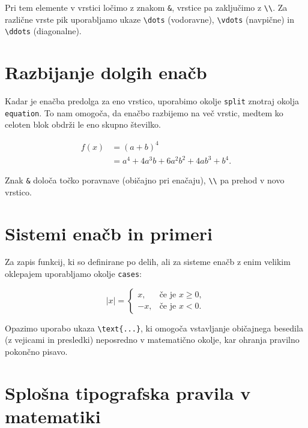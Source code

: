 \documentclass[a4paper,12pt,openright]{book}
\begin{document}
Pri tem elemente v vrstici ločimo z znakom \texttt{\&}, vrstice pa zaključimo z \texttt{\textbackslash\textbackslash}. Za različne vrste pik uporabljamo ukaze \verb|\dots| (vodoravne), \verb|\vdots| (navpične) in \verb|\ddots| (diagonalne).

\section{Razbijanje dolgih enačb}

Kadar je enačba predolga za eno vrstico, uporabimo okolje \texttt{split} znotraj okolja \texttt{equation}. To nam omogoča, da enačbo razbijemo na več vrstic, medtem ko celoten blok obdrži le eno skupno številko.

\begin{equation}
    \begin{split}
        f(x) &= (a+b)^4 \\
             &= a^4 + 4a^3b + 6a^2b^2 + 4ab^3 + b^4.
    \end{split}
    \label{eq:razcep}
\end{equation}

Znak \texttt{\&} določa točko poravnave (običajno pri enačaju), \texttt{\textbackslash\textbackslash} pa prehod v novo vrstico.

\section{Sistemi enačb in primeri}

Za zapis funkcij, ki so definirane po delih, ali za sisteme enačb z enim velikim oklepajem uporabljamo okolje \texttt{cases}:

\begin{equation}
    |x| = \begin{cases}
        x,  & \text{če je } x \ge 0, \\
        -x, & \text{če je } x < 0.
    \end{cases}
\end{equation}

Opazimo uporabo ukaza \verb|\text{...}|, ki omogoča vstavljanje običajnega besedila (z vejicami in presledki) neposredno v matematično okolje, kar ohranja pravilno pokončno pisavo.

\section{Splošna tipografska pravila v matematiki}
\end{document}
